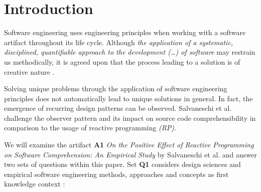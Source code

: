 \documentclass[11pt,a4paper,twocolumn]{article}
\begin{document}

	\section{Introduction}
	Software engineering uses engineering principles when working with a software artifact \cite{159342} throughout its life cycle. Although \emph{the application of a systematic, disciplined, quantifiable approach to the development (\dots) of software} \cite{159342} may restrain us methodically, it is agreed upon that the process leading to a solution is of creative nature \cite{8051350}.

	Solving unique problems through the application of software engineering principles does not automatically lead to unique solutions in general. In fact, the emergence of recurring design patterns can be observed. Salvaneschi et al. \cite{7827078} challenge the observer pattern \cite{gamma1995design} and its impact on source code comprehensibility in comparison to the usage of reactive programming \emph{(RP)}.

	We will examine the artifact \cite{balestra:2019:designscience:articactandcontext} \textbf{A1} \emph{On the Positive Effect of Reactive Programming on Software Comprehension: An Empirical Study} by Salvaneschi et al. \cite{7827078} and answer two sets of questions within this paper. Set \textbf{Q1} considers design sciences and empirical software engineering methods, approaches and concepts as first knowledge context \cite{balestra:2019:designscience:articactandcontext}:
\end{document}
